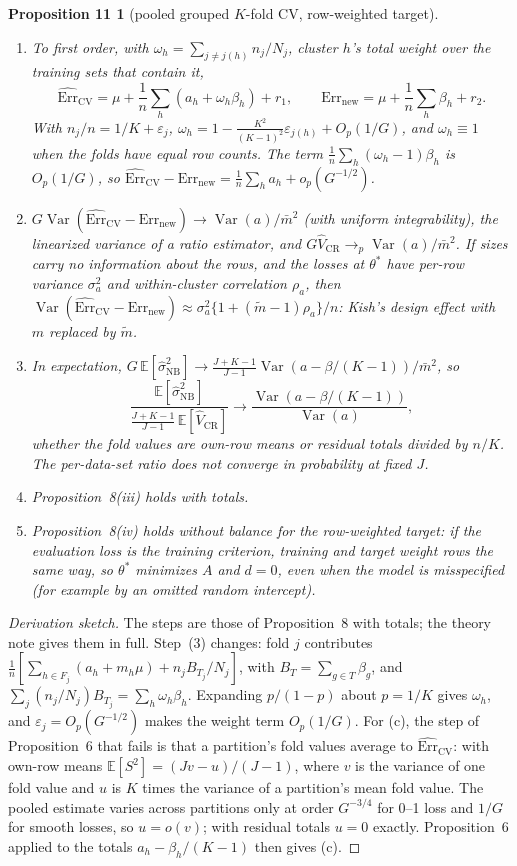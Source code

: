 \documentclass[11pt]{amsart}
\theoremstyle{plain}
\newtheorem*{prop11}{Proposition 11}
\theoremstyle{definition}
\theoremstyle{remark}
\newcommand{\Var}{\operatorname{Var}}
\newcommand{\E}{\mathbb{E}}
\newcommand{\CV}{\widehat{\mathrm{Err}}_{\mathrm{CV}}}
\newcommand{\Errnew}{\mathrm{Err}_{\mathrm{new}}}
\newcommand{\VCR}{\hat V_{\mathrm{CR}}}
\newcommand{\VNB}{\hat\sigma^2_{\mathrm{NB}}}
\newcommand{\fac}{\tfrac{J+K-1}{J-1}}
\begin{document}
\begin{prop11}[pooled grouped $K$-fold CV, row-weighted target]
\begin{enumerate}[label=(\alph*)]
\item To first order, with $\omega_h=\sum_{j\neq j(h)}n_j/N_j$, cluster $h$'s total weight over the training sets that contain it,
\[
\CV=\mu+\frac1n\sum_h(a_h+\omega_h\beta_h)+r_1,\qquad \Errnew=\mu+\frac1n\sum_h\beta_h+r_2 .
\]
With $n_j/n=1/K+\varepsilon_j$, $\omega_h=1-\frac{K^2}{(K-1)^2}\varepsilon_{j(h)}+O_p(1/G)$, and $\omega_h\equiv1$ when the folds have equal row counts. The term $\frac1n\sum_h(\omega_h-1)\beta_h$ is $O_p(1/G)$, so $\CV-\Errnew=\frac1n\sum_ha_h+o_p(G^{-1/2})$.
\item $G\Var(\CV-\Errnew)\to\Var(a)/\bar m^2$ (with uniform integrability), the linearized variance of a ratio estimator, and $G\VCR\to_p\Var(a)/\bar m^2$. If sizes carry no information about the rows, and the losses at $\theta^*$ have per-row variance $\sigma_a^2$ and within-cluster correlation $\rho_a$, then $\Var(\CV-\Errnew)\approx\sigma_a^2\{1+(\tilde m-1)\rho_a\}/n$: Kish's design effect with $m$ replaced by $\tilde m$.
\item \emph{In expectation}, $G\,\E[\VNB]\to\fac\Var(a-\beta/(K-1))/\bar m^2$, so
\[
\frac{\E[\VNB]}{\fac\,\E[\VCR]}\to\frac{\Var(a-\beta/(K-1))}{\Var(a)},
\]
whether the fold values are own-row means or residual totals divided by $n/K$. The per-data-set ratio does not converge in probability at fixed $J$.
\item Proposition~8(iii) holds with totals.
\item Proposition~8(iv) holds without balance for the row-weighted target: if the evaluation loss is the training criterion, training and target weight rows the same way, so $\theta^*$ minimizes $A$ and $d=0$, even when the model is misspecified (for example by an omitted random intercept).
\end{enumerate}
\end{prop11}

\begin{proof}[Derivation sketch]
The steps are those of Proposition~8 with totals; the theory note gives them in full. Step~(3) changes: fold $j$ contributes $\frac1n[\sum_{h\in F_j}(a_h+m_h\mu)+n_jB_{T_j}/N_j]$, with $B_T=\sum_{g\in T}\beta_g$, and $\sum_j(n_j/N_j)B_{T_j}=\sum_h\omega_h\beta_h$. Expanding $p/(1-p)$ about $p=1/K$ gives $\omega_h$, and $\varepsilon_j=O_p(G^{-1/2})$ makes the weight term $O_p(1/G)$. For (c), the step of Proposition~6 that fails is that a partition's fold values average to $\CV$: with own-row means $\E[S^2]=(Jv-u)/(J-1)$, where $v$ is the variance of one fold value and $u$ is $K$ times the variance of a partition's mean fold value. The pooled estimate varies across partitions only at order $G^{-3/4}$ for 0--1 loss and $1/G$ for smooth losses, so $u=o(v)$; with residual totals $u=0$ exactly. Proposition~6 applied to the totals $a_h-\beta_h/(K-1)$ then gives (c).
\end{proof}
\end{document}
